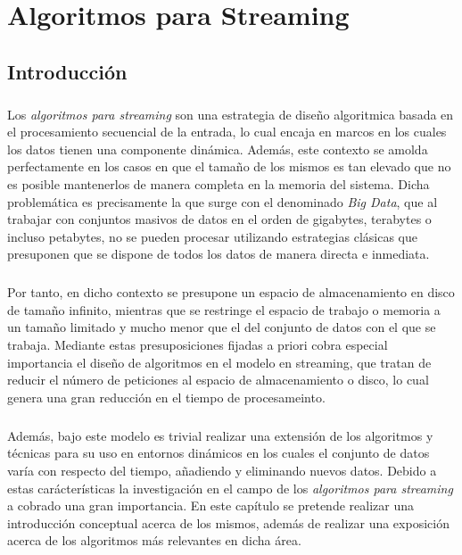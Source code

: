 \documentclass{subfiles}
\begin{document}
  \chapter{Algoritmos para Streaming}
  \label{chapter:streaming}


    \section{Introducción}
    \label{sec:streaming_intro}

      \paragraph{}
      Los \emph{algoritmos para streaming} son una estrategia de diseño algoritmica basada en el procesamiento secuencial de la entrada, lo cual encaja en marcos en los cuales los datos tienen una componente dinámica. Además, este contexto se amolda perfectamente en los casos en que el tamaño de los mismos es tan elevado que no es posible mantenerlos de manera completa en la memoria del sistema. Dicha problemática es precisamente la que surge con el denominado \emph{Big Data}, que al trabajar con conjuntos masivos de datos en el orden de gigabytes, terabytes o incluso petabytes, no se pueden procesar utilizando estrategias clásicas que presuponen que se dispone de todos los datos de manera directa e inmediata.

      \paragraph{}
      Por tanto, en dicho contexto se presupone un espacio de almacenamiento en disco de tamaño infinito, mientras que se restringe el espacio de trabajo o memoria a un tamaño limitado y mucho menor que el del conjunto de datos con el que se trabaja. Mediante estas presuposiciones fijadas a priori cobra especial importancia el diseño de algoritmos en el modelo en streaming, que tratan de reducir el número de peticiones al espacio de almacenamiento o disco, lo cual genera una gran reducción en el tiempo de procesameinto.

      \paragraph{}
      Además, bajo este modelo es trivial realizar una extensión de los algoritmos y técnicas para su uso en entornos dinámicos en los cuales el conjunto de datos varía con respecto del tiempo, añadiendo y eliminando nuevos datos. Debido a estas carácterísticas la investigación en el campo de los \emph{algoritmos para streaming} a cobrado una gran importancia. En este capítulo se pretende realizar una introducción conceptual acerca de los mismos, además de realizar una exposición acerca de los algoritmos más relevantes en dicha área.
\end{document}
